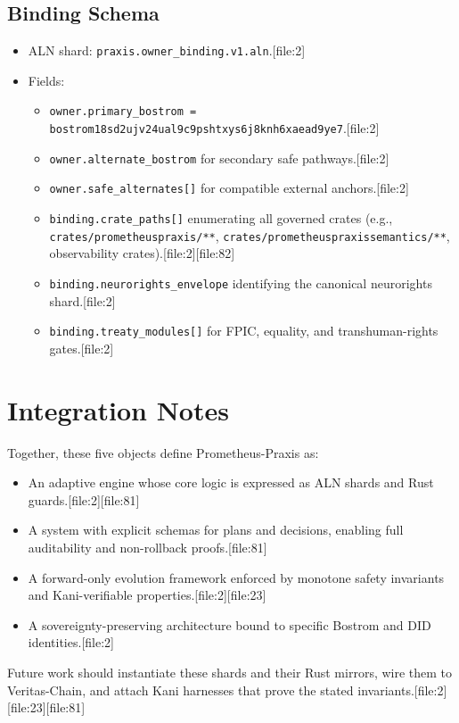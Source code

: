 \documentclass[11pt]{article}
\begin{document}
\subsection{Binding Schema}

\begin{itemize}[nosep]
  \item ALN shard: \texttt{praxis.owner\_binding.v1.aln}.[file:2]
  \item Fields:
    \begin{itemize}[nosep]
      \item \texttt{owner.primary\_bostrom = bostrom18sd2ujv24ual9c9pshtxys6j8knh6xaead9ye7}.[file:2]
      \item \texttt{owner.alternate\_bostrom} for secondary safe pathways.[file:2]
      \item \texttt{owner.safe\_alternates[]} for compatible external anchors.[file:2]
      \item \texttt{binding.crate\_paths[]} enumerating all governed crates (e.g., \texttt{crates/prometheuspraxis/**}, \texttt{crates/prometheuspraxissemantics/**}, observability crates).[file:2][file:82]
      \item \texttt{binding.neurorights\_envelope} identifying the canonical neurorights shard.[file:2]
      \item \texttt{binding.treaty\_modules[]} for FPIC, equality, and transhuman-rights gates.[file:2]
    \end{itemize}
\end{itemize}

\section{Integration Notes}

Together, these five objects define Prometheus-Praxis as:

\begin{itemize}[nosep]
  \item An adaptive engine whose core logic is expressed as ALN shards and Rust guards.[file:2][file:81]
  \item A system with explicit schemas for plans and decisions, enabling full auditability and non-rollback proofs.[file:81]
  \item A forward-only evolution framework enforced by monotone safety invariants and Kani-verifiable properties.[file:2][file:23]
  \item A sovereignty-preserving architecture bound to specific Bostrom and DID identities.[file:2]
\end{itemize}

Future work should instantiate these shards and their Rust mirrors, wire them to Veritas-Chain, and attach Kani harnesses that prove the stated invariants.[file:2][file:23][file:81]
\end{document}

